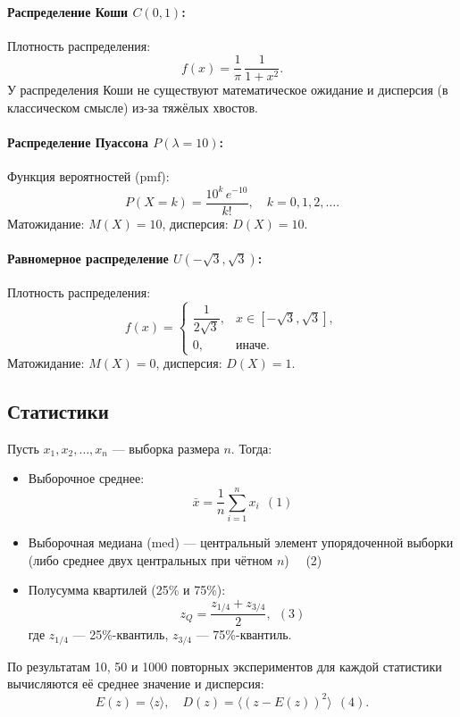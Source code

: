 \documentclass{article}
\begin{document}
\paragraph{Распределение Коши \( C(0,1) \):}
Плотность распределения:
\[
  f(x) = \frac{1}{\pi}\, \frac{1}{1+x^2}.
\]
У распределения Коши не существуют математическое ожидание и дисперсия (в классическом смысле) из-за тяжёлых хвостов.

\paragraph{Распределение Пуассона \( P(\lambda=10) \):}
Функция вероятностей (pmf):
\[
  P(X=k) = \frac{10^k\, e^{-10}}{k!}, \quad k = 0,1,2,\dots.
\]
Матожидание: \( M(X)=10 \), дисперсия: \( D(X)=10 \).

\paragraph{Равномерное распределение \( U(-\sqrt{3},\sqrt{3}) \):}
Плотность распределения:
\[
  f(x) = 
  \begin{cases}
    \dfrac{1}{2\sqrt{3}}, & x \in \left[-\sqrt{3},\sqrt{3}\right],\\[2mm]
    0, & \text{иначе}.
  \end{cases}
\]
Матожидание: \( M(X)=0 \), дисперсия: \( D(X)=1 \).

\subsection{Статистики}

Пусть \( x_1,x_2,\dots,x_n \) --- выборка размера \( n \). Тогда:
\begin{itemize}
    \item Выборочное среднее:
    \[
      \bar{x} = \frac{1}{n} \sum_{i=1}^{n} x_i \ \ (1)
    \]
    \item Выборочная медиана (\(\mathrm{med}\)) --- центральный элемент упорядоченной выборки (либо среднее двух центральных при чётном \( n \)) \ \ (2)
    \item Полусумма квартилей (25\% и 75\%):
    \[
      z_Q = \frac{z_{1/4} + z_{3/4}}{2}, \ \ (3)
    \]
    где \( z_{1/4} \) --- 25\%-квантиль, \( z_{3/4} \) --- 75\%-квантиль.
\end{itemize}

По результатам 10, 50 и 1000 повторных экспериментов для каждой статистики вычисляются её среднее значение и дисперсия:
\[
E(z) = \langle z \rangle, \quad D(z) = \langle (z - E(z))^2 \rangle \ \ (4).
\]
\end{document}
